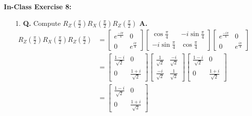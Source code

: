 \documentclass[main.tex]{subfiles}
\begin{document}
\begin{enumerate}
\item[] \textbf{In-Class Exercise 8:} 
\begin{enumerate}
    \item [1.] \textbf{Q.} Compute $R_{Z}\left(\frac{\pi}{2}\right) R_{X}\left(\frac{\pi}{2}\right) R_{Z}\left(\frac{\pi}{2}\right)$ \textbf{A.}
    \begin{align*}
        R_{Z}\left(\frac{\pi}{2}\right)
        R_{X}\left(\frac{\pi}{2}\right)
        R_{Z}\left(\frac{\pi}{2}\right) & = \left[\begin{array}{ll}e^{\frac{-i \pi}{4}} & 0 \\
                                        0 & e^{\frac{i \pi}{4}} \end{array}\right]
                                        \left[\begin{array}{ll}\cos \frac{\pi}{4} & -i \sin \frac{\pi}{4} \\
                                        -i \sin \frac{\pi}{4} & \cos \frac{\pi}{4}\end{array}\right]
                                        \left[\begin{array}{ll}e^{\frac{-i \pi}{4}} & 0 \\
                                        0 & e^{\frac{i \pi}{4}} \end{array}\right]\\
                                        & = \left[\begin{array}{ll}\frac{1-i}{\sqrt{2}} & 0 \\
                                        0 & \frac{1+i}{\sqrt{2}}\end{array}\right]
                                        \left[\begin{array}{ll} \frac{1}{\sqrt{2}} & \frac{-i}{\sqrt{2}} \\
                                        \frac{-i}{\sqrt{2}} & \frac{1}{\sqrt{2}}\end{array}\right]
                                        \left[\begin{array}{ll}\frac{1-i}{\sqrt{2}} & 0 \\
                                        0 & \frac{1+i}{\sqrt{2}}\end{array}\right]\\
                                        & = \left[\begin{array}{ll}\frac{1-i}{\sqrt{2}} & 0 \\
                                        0 & \frac{1+i}{\sqrt{2}}\end{array}\right]

\end{align*}
\end{enumerate}
\end{enumerate}
\end{document}
